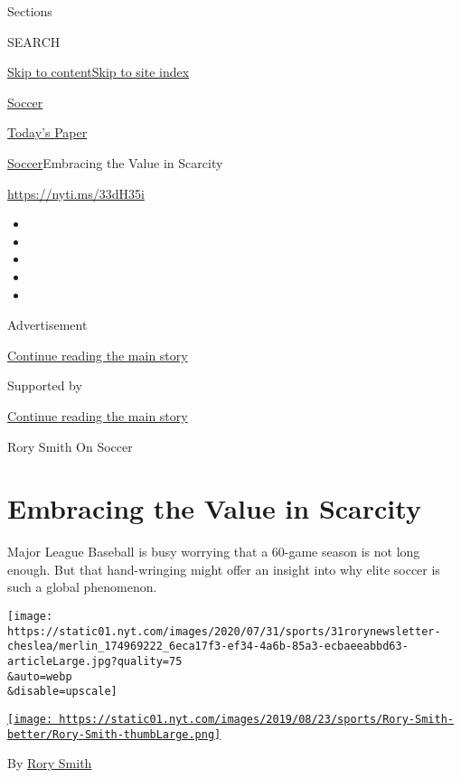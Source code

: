 Sections

SEARCH

\protect\hyperlink{site-content}{Skip to
content}\protect\hyperlink{site-index}{Skip to site index}

\href{https://www.nytimes.com/section/sports/soccer}{Soccer}

\href{https://myaccount.nytimes.com/auth/login?response_type=cookie\&client_id=vi}{}

\href{https://www.nytimes.com/section/todayspaper}{Today's Paper}

\href{/section/sports/soccer}{Soccer}\textbar{}Embracing the Value in
Scarcity

\url{https://nyti.ms/33dH35i}

\begin{itemize}
\item
\item
\item
\item
\item
\end{itemize}

Advertisement

\protect\hyperlink{after-top}{Continue reading the main story}

Supported by

\protect\hyperlink{after-sponsor}{Continue reading the main story}

Rory Smith On Soccer

\hypertarget{embracing-the-value-in-scarcity}{%
\section{Embracing the Value in
Scarcity}\label{embracing-the-value-in-scarcity}}

Major League Baseball is busy worrying that a 60-game season is not long
enough. But that hand-wringing might offer an insight into why elite
soccer is such a global phenomenon.

\texttt{[image: https://static01.nyt.com/images/2020/07/31/sports/31rorynewsletter-cheslea/merlin\_174969222\_6eca17f3-ef34-4a6b-85a3-ecbaeeabbd63-articleLarge.jpg?quality=75\\\&auto=webp\\\&disable=upscale]}

\href{https://www.nytimes.com/by/rory-smith}{\texttt{[image: https://static01.nyt.com/images/2019/08/23/sports/Rory-Smith-better/Rory-Smith-thumbLarge.png]}}

By \href{https://www.nytimes.com/by/rory-smith}{Rory Smith}

